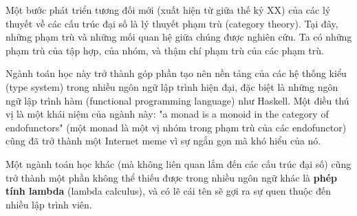 
Một bước phát triển tương đối mới (xuất hiện từ giữa thế kỷ XX) của các lý thuyết về các cấu trúc đại số là lý thuyết phạm trù (category theory). Tại đây, những phạm trù và những mối quan hệ giữa chúng được nghiên cứu. Ta có những phạm trù của tập hợp, của nhóm, và thậm chí phạm trù của các phạm trù.

Ngành toán học này trở thành góp phần tạo nên nền tảng của các hệ thống kiểu (type system) trong nhiều ngôn ngữ lập trình hiện đại, đặc biệt là những ngôn ngữ lập trình hàm (functional programming language) như Haskell. Một điều thú vị là một khái niệm của ngành này: "a monad is a monoid in the category of endofunctors" (một monad là một vị nhóm trong phạm trù của các endofunctor) cũng đã trở thành một Internet meme vì sự ngắn gọn mà khó hiểu của nó.

Một ngành toán học khác (mà không liên quan lắm đến các cấu trúc đại số) cũng trở thành một phần không thể thiếu được trong nhiều ngôn ngữ khác là \textbf{phép tính lambda} (lambda calculus), và có lẽ cái tên sẽ gợi ra sự quen thuộc đến nhiều lập trình viên.